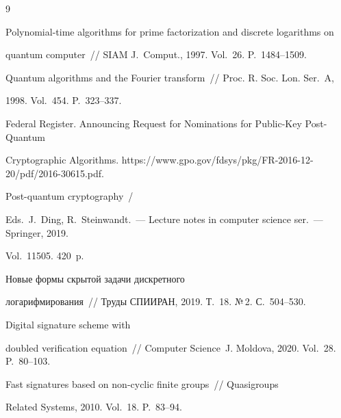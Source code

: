 {\small\frenchspacing


{%




\begin{thebibliography}{9}




 Polynomial-time algorithms for prime factorization and discrete logarithms on 


quantum computer~/\!\!/ SIAM J.~Comput., 1997. Vol.~26. P.~1484--1509.




 Quantum algorithms and the Fourier transform~/\!\!/ Proc. R. Soc. Lon. Ser.~A, 


1998. Vol.~454. P.~323--337.




Federal Register. Announcing Request for Nominations for Public-Key Post-Quantum 


Cryptographic Algorithms. {\sf https://www.gpo.gov/fdsys/pkg/FR-2016-12-20/pdf/2016-30615.pdf}.




Post-quantum cryptography~/ 


Eds.\ J.~Ding,  R.~Steinwandt.~--- Lecture notes in computer science ser.~--- Springer, 2019. 


Vol.~11505. 420~p.




 Новые формы скрытой задачи дискретного 


логарифмирования~/\!\!/ Труды СПИИРАН, 2019.  Т.~18. №\,2. С.~504--530.




 Digital signature scheme with 


doubled verification equation~/\!\!/ Computer Science~J. Moldova, 2020. Vol.~28. P.~80--103.




 Fast signatures based on non-cyclic finite groups~/\!\!/ Quasigroups  


Related Systems, 2010. Vol.~18. P.~83--94.


  


      \end{thebibliography}


} }











